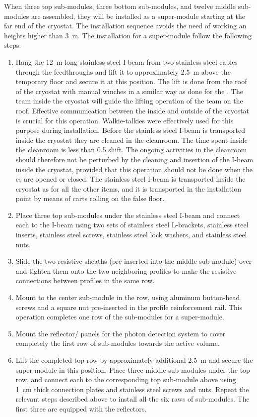 When three top sub-modules, three bottom sub-modules, and twelve middle sub-modules are assembled, they will be installed as a super-module starting at the far end of the cryostat.
The installation sequence avoids the need of working an heights higher than 3~m.
The installation for a super-module follow the following steps:
\begin{enumerate}
\item Hang the 12~m-long stainless steel I-beam from two stainless steel cables through the feedthroughs and lift it to approximately 2.5~m above the temporary floor and secure it at this position.
The lift is done from the roof of the cryostat with manual winches in a similar way as done for the .
The team inside the cryostat will guide the lifting operation of the team on the roof.
Effective communication between the inside and outside of the cryostat is crucial for this operation.
Walkie-talkies were effectively used for this purpose during  installation.
Before the stainless steel I-beam is transported inside the cryostat they are cleaned in the cleanroom.
The time spent inside the cleanroom is less than 0.5 shift.
The ongoing activities in the cleanroom should therefore not be perturbed by the cleaning and insertion of the I-beam inside the cryostat, provided that this operation should not be done when the  \coldbox{}es are opened or closed.
The stainless steel I-beam is transported inside the cryostat as for all the other items, and it is transported in the installation point by means of carts rolling on the false floor.
\item Place three top sub-modules under the stainless steel I-beam and connect each to the I-beam using two sets of stainless steel L-brackets, stainless steel inserts, stainless steel screws, stainless steel lock washers, and stainless steel nuts.
\item Slide the two resistive sheaths (pre-inserted into the middle sub-module) over and tighten them onto the two neighboring profiles to make the resistive connections between profiles in the same row.
\item Mount  to the center sub-module in the row, using aluminum button-head screws and a square nut pre-inserted in the profile reinforcement rail.
This operation completes one row of the sub-modules for a super-module.
\item Mount the reflector/ panels for the photon detection system to cover completely the first row of sub-modules towards the active volume.
\item Lift the completed top row by approximately additional 2.5~m and secure the super-module in this position.
Place three middle sub-modules under the top row, and connect each to the corresponding top sub-module above using 1~cm thick connection plates and stainless steel screws and nuts.
Repeat the relevant steps described above to install all the six raws of sub-modules.
The first three are equipped with the reflectors.
\end{enumerate}

